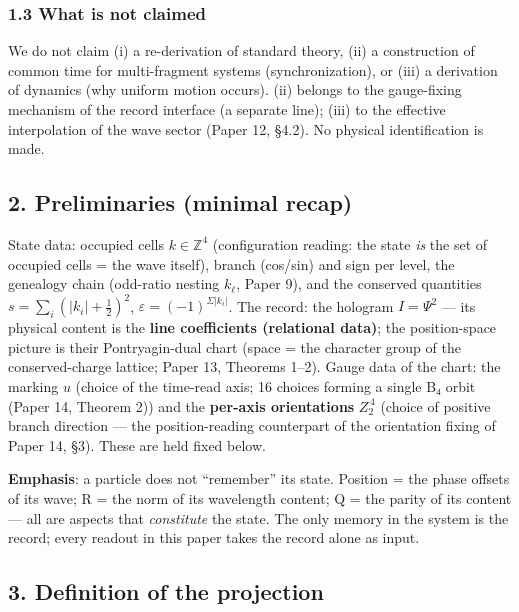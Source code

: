 \documentclass[
]{ltjsarticle}
\begin{document}
\subsubsection{1.3 What is not claimed}\label{what-is-not-claimed}

We do not claim (i) a re-derivation of standard theory, (ii) a
construction of common time for multi-fragment systems
(synchronization), or (iii) a derivation of dynamics (why uniform motion
occurs). (ii) belongs to the gauge-fixing mechanism of the record
interface (a separate line); (iii) to the effective interpolation of the
wave sector (Paper 12, §4.2). No physical identification is made.

\subsection{2. Preliminaries (minimal
recap)}\label{preliminaries-minimal-recap}

State data: occupied cells \(k\in\mathbb{Z}^4\) (configuration reading:
the state \emph{is} the set of occupied cells = the wave itself), branch
(cos/sin) and sign per level, the genealogy chain (odd-ratio nesting
\(k_\ell\), Paper 9), and the conserved quantities
\(s=\sum_i(|k_i|+\tfrac12)^2\), \(\varepsilon=(-1)^{\Sigma|k_i|}\). The
record: the hologram \(I=\Psi^2\) --- its physical content is the
\textbf{line coefficients (relational data)}; the position-space picture
is their Pontryagin-dual chart (space = the character group of the
conserved-charge lattice; Paper 13, Theorems 1--2). Gauge data of the
chart: the marking \(u\) (choice of the time-read axis; 16 choices
forming a single B₄ orbit (Paper 14, Theorem 2)) and the
\textbf{per-axis orientations} \(Z_2^{\,4}\) (choice of positive branch
direction --- the position-reading counterpart of the orientation fixing
of Paper 14, §3). These are held fixed below.

\textbf{Emphasis}: a particle does not ``remember'' its state. Position
= the phase offsets of its wave; R = the norm of its wavelength content;
Q = the parity of its content --- all are aspects that \emph{constitute}
the state. The only memory in the system is the record; every readout in
this paper takes the record alone as input.

\subsection{3. Definition of the
projection}\label{definition-of-the-projection}
\end{document}
